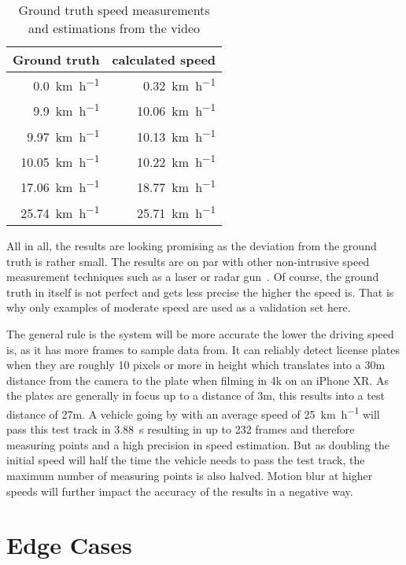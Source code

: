 \begin{table}[]
    \centering
    \begin{tabular}{|r|r|}
        \hline
        \multicolumn{1}{|l|}{Ground truth} & \multicolumn{1}{l|}{calculated speed} \\ \hline
        \SI{0.0}{\kilo\metre\per\hour}     & \SI{0.32}{\kilo\metre\per\hour}      \\
        \SI{9.9}{\kilo\metre\per\hour}     & \SI{10.06}{\kilo\metre\per\hour}      \\
        \SI{9.97}{\kilo\metre\per\hour}    & \SI{10.13}{\kilo\metre\per\hour}      \\
        \SI{10.05}{\kilo\metre\per\hour}   & \SI{10.22}{\kilo\metre\per\hour}      \\
        \SI{17.06}{\kilo\metre\per\hour}   & \SI{18.77}{\kilo\metre\per\hour}      \\
        \SI{25.74}{\kilo\metre\per\hour}   & \SI{25.71}{\kilo\metre\per\hour}      \\ \hline
    \end{tabular}
    \caption{Ground truth speed measurements \\and estimations from the video}
    \label{tab:speedEstimation}
\end{table}

All in all, the results are looking promising as the deviation from the ground truth is rather small.
The results are on par with other non-intrusive speed measurement techniques such as a laser or radar gun~\cite{Adnan2013}.
Of course, the ground truth in itself is not perfect and gets less precise the higher the speed is.
That is why only examples of moderate speed are used as a validation set here.

The general rule is the system will be more accurate the lower the driving speed is, as it has more frames to sample data from.
It can reliably detect license plates when they are roughly 10 pixels or more in height which translates into a 30m distance from the camera to the plate when filming in 4k on an iPhone XR.
As the plates are generally in focus up to a distance of 3m, this results into a test distance of 27m.
A vehicle going by with an average speed of \SI{25}{\kilo\metre\per\hour} will pass this test track in \SI{3.88}{\second} resulting in up to 232 frames and therefore measuring points and a high precision in speed estimation.
But as doubling the initial speed will half the time the vehicle needs to pass the test track, the maximum number of measuring points is also halved.
Motion blur at higher speeds will further impact the accuracy of the results in a negative way.



\section{Edge Cases}

